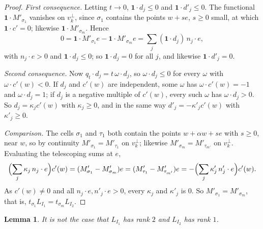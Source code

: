 \documentclass[11pt]{article}
\newcommand{\one}{\mathbf{1}}
\theoremstyle{plain}
\newtheorem{lemma}[theorem]{Lemma}
\theoremstyle{definition}
\theoremstyle{remark}
\begin{document}
\begin{proof}
\emph{First consequence.} Letting $t\to0$, $\one\cdot d_j\le0$ and $\one\cdot d'_j\le0$.
The functional $\one\cdot M'_{\sigma_1}$ vanishes on $v_k^\perp$, since $\sigma_1$
contains the points $w+se$, $s\ge0$ small, at which $\one\cdot c'=0$; likewise $\one\cdot
M'_{\sigma_m}$. Hence
\[
  0=\one\cdot M'_{\sigma_1}e-\one\cdot M'_{\sigma_m}e=\sum_j(\one\cdot d_j)\,n_j\cdot e,
\]
with $n_j\cdot e>0$ and $\one\cdot d_j\le0$; so $\one\cdot d_j=0$ for all $j$, and likewise
$\one\cdot d'_j=0$.

\emph{Second consequence.} Now $q_t\cdot d_j=t\,\omega\cdot d_j$, so $\omega\cdot d_j\le0$
for every $\omega$ with $\omega\cdot c'(w)<0$. If $d_j$ and $c'(w)$ are independent, some
$\omega$ has $\omega\cdot c'(w)=-1$ and $\omega\cdot d_j=1$; if $d_j$ is a negative multiple
of $c'(w)$, every such $\omega$ has $\omega\cdot d_j>0$. So $d_j=\kappa_jc'(w)$ with
$\kappa_j\ge0$, and in the same way $d'_j=-\kappa'_jc'(w)$ with $\kappa'_j\ge0$.

\emph{Comparison.} The cells $\sigma_1$ and $\tau_1$ both contain the points $w+\alpha w+se$
with $s\ge0$, near $w$, so by continuity $M'_{\sigma_1}=M'_{\tau_1}$ on $v_k^\perp$; likewise
$M'_{\sigma_m}=M'_{\tau_{m'}}$ on $v_k^\perp$. Evaluating the telescoping sums at $e$,
\[
  \Bigl(\sum_j\kappa_j\,n_j\cdot e\Bigr)c'(w)=(M'_{\sigma_1}-M'_{\sigma_m})e=
  (M'_{\tau_1}-M'_{\tau_{m'}})e=-\Bigl(\sum_j\kappa'_j\,n'_j\cdot e\Bigr)c'(w).
\]
As $c'(w)\ne0$ and all $n_j\cdot e,n'_j\cdot e>0$, every $\kappa_j$ and $\kappa'_j$ is $0$.
So $M'_{\sigma_1}=M'_{\sigma_m}$, that is, $t_{\sigma_1}L_{I_1}=t_{\sigma_m}L_{I_2}$.
\end{proof}

\begin{lemma}\label{lem:junction}
It is not the case that $L_{I_1}$ has rank $2$ and $L_{I_2}$ has rank $1$.
\end{lemma}
\end{document}
